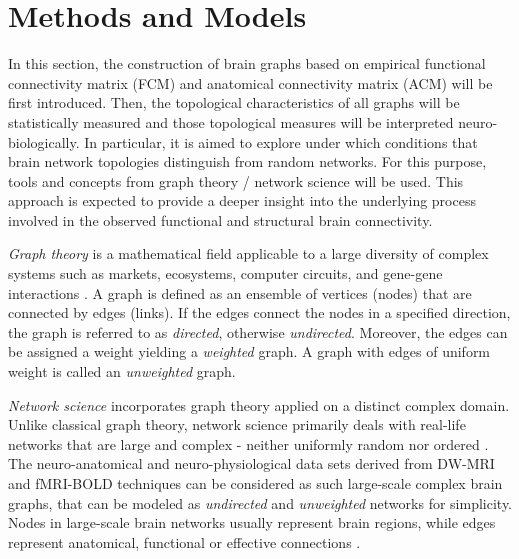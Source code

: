 
\chapter{Methods and Models} %

\label{Chapter2} %



In this section, the construction of brain graphs based on empirical functional connectivity matrix (FCM) and anatomical connectivity matrix (ACM) will be first introduced. Then, the topological characteristics of all graphs will be statistically measured and those topological measures will be interpreted neuro-biologically. In particular, it is aimed to explore under which conditions that brain network topologies distinguish from random networks. For this purpose, tools and concepts from graph theory / network science will be used. This approach is expected to provide a deeper insight into the underlying process involved in the observed functional and structural brain connectivity. 


\textit{Graph theory} is a mathematical field applicable to a large diversity of complex systems such as markets, ecosystems, computer circuits, and gene-gene interactions \citep{XYZ09}. A graph is defined as an ensemble of vertices (nodes) that are connected by edges (links). If the edges connect the nodes in a specified direction, the graph is referred to as \textit{directed}, otherwise \textit{undirected}. Moreover, the edges can be assigned a weight yielding a \textit{weighted} graph. A graph with edges of uniform weight is called an \textit{unweighted} graph.

\textit{Network science} incorporates graph theory applied on a   
distinct complex domain. Unlike classical graph theory, network science primarily deals with real-life networks that are large and complex - neither uniformly random nor ordered \citep{RUB10}. The neuro-anatomical and neuro-physiological data sets derived from  DW-MRI and fMRI-BOLD techniques can be considered as such large-scale complex brain graphs, that can be modeled as \textit{undirected} and \textit{unweighted} networks for simplicity. Nodes in large-scale brain networks usually represent brain regions, while edges represent anatomical, functional or effective connections \citep{XYZ94}. 


